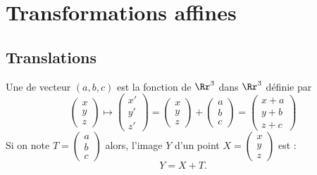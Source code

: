 \documentclass[11pt,class=report,crop=false]{standalone}
\begin{document}

%
%
%




\section{Transformations affines}

\subsection{Translations}


Une  de vecteur $(a,b,c)$ est la fonction de $\Rr^3$ dans $\Rr^3$ définie par 
$$\begin{pmatrix}x\\y\\z\end{pmatrix} \longmapsto \begin{pmatrix}x'\\y'\\z'\end{pmatrix} 
= \begin{pmatrix}x\\y\\z\end{pmatrix} + \begin{pmatrix}a\\b\\c\end{pmatrix}
= \begin{pmatrix}x+a\\y+b\\z+c\end{pmatrix}$$
Si on note $T = \left( \begin{smallmatrix}a\\b\\c \end{smallmatrix} \right)$ alors, l'image $Y$ d'un point $X = \left( \begin{smallmatrix}x\\y\\z \end{smallmatrix} \right)$ est :
$$Y = X + T.$$
\end{document}
